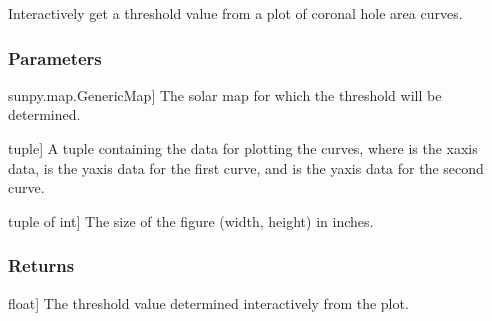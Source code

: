 \documentclass[letterpaper,10pt,english]{sphinxmanual}
\begin{document}
\begin{fulllineitems}
\label{\detokenize{pycatch/utils/plot:pycatch.utils.plot.get_thr_from_curves}}
\pysigstartsignatures
{}
\pysigstopsignatures
\sphinxAtStartPar
Interactively get a threshold value from a plot of coronal hole area curves.


\subsubsection{Parameters}
\label{\detokenize{pycatch/utils/plot:id2}}\begin{description}
\sphinxlineitem{map}{[}sunpy.map.GenericMap{]}
\sphinxAtStartPar
The solar map for which the threshold will be determined.

\sphinxlineitem{curves}{[}tuple{]}
\sphinxAtStartPar
A tuple containing the data for plotting the curves, where  is
the x\sphinxhyphen{}axis data,  is the y\sphinxhyphen{}axis data for the first curve, and
 is the y\sphinxhyphen{}axis data for the second curve.

\sphinxlineitem{fsize}{[}tuple of int{]}
\sphinxAtStartPar
The size of the figure (width, height) in inches.

\end{description}


\subsubsection{Returns}
\label{\detokenize{pycatch/utils/plot:id3}}\begin{description}
\sphinxlineitem{thr}{[}float{]}
\sphinxAtStartPar
The threshold value determined interactively from the plot.

\end{description}

\end{fulllineitems}

\end{document}
